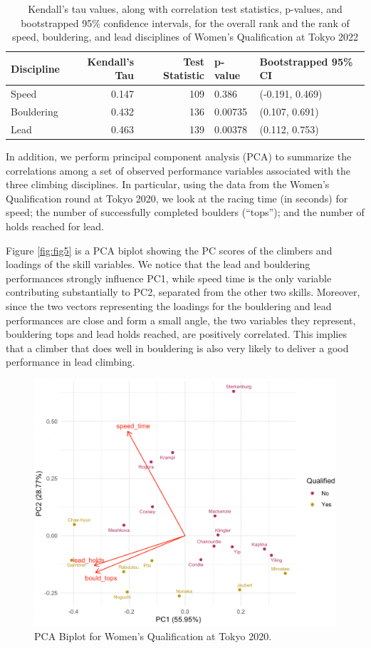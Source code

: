 \documentclass[letterpaper, inpress]{jds} %
\begin{document}
\begin{table}[tbp]
  \caption{Kendall's tau values, along with correlation
test statistics, p-values, and bootstrapped 95\% confidence intervals,
for the overall rank and the rank of speed, bouldering, and lead
disciplines of Women's Qualification at Tokyo 2022}%
  \label{tab:tab1}
  \centering
  \begin{tabular}[]{@{}lrrll@{}}
\toprule
Discipline & Kendall's Tau & Test Statistic & p-value & Bootstrapped
95\% CI \\
\midrule
Speed & 0.147 & 109 & 0.386 & (-0.191, 0.469) \\
Bouldering & 0.432 & 136 & 0.00735 & (0.107, 0.691) \\
Lead & 0.463 & 139 & 0.00378 & (0.112, 0.753) \\
\bottomrule
  \end{tabular}
\end{table}

In addition, we perform principal component analysis (PCA) to summarize
the correlations among a set of observed performance variables
associated with the three climbing disciplines. In particular, using the
data from the Women's Qualification round at Tokyo 2020, we look at the
racing time (in seconds) for speed; the number of successfully completed
boulders (``tops''); and the number of holds reached for lead.

Figure \ref{fig:fig5} is a PCA biplot showing the PC scores of the
climbers and loadings of the skill variables. We notice that the lead
and bouldering performances strongly influence PC1, while speed time is
the only variable contributing substantially to PC2, separated from the
other two skills. Moreover, since the two vectors representing the
loadings for the bouldering and lead performances are close and form a
small angle, the two variables they represent, bouldering tops and lead
holds reached, are positively correlated. This implies that a climber
that does well in bouldering is also very likely to deliver a good
performance in lead climbing.

\begin{figure}

{\centering \includegraphics[width=0.7\linewidth]{pca} 

}

\caption{\label{fig:fig5}PCA Biplot for Women's Qualification at Tokyo 2020.}\label{fig:pca}
\end{figure}
\end{document}
